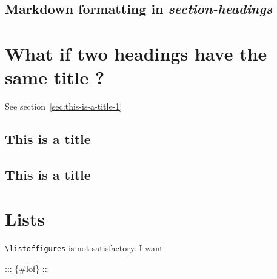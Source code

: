 \documentclass[
]{article}
\newenvironment{Shaded}{}{}
\newcommand{\NormalTok}[1]{#1}
\begin{document}
\subsection{\texorpdfstring{Markdown \textbf{formatting} in
\emph{section-headings}}{Markdown formatting in section-headings}}\label{markdown-formatting-in-section-headings}

\section{What if two headings have the same title
?}\label{what-if-two-headings-have-the-same-title}

See section~\ref{sec:this-is-a-title-1}

\subsection{This is a title}\label{this-is-a-title}

\subsection{This is a title}\label{this-is-a-title-1}

\section{Lists}\label{lists-1}

\texttt{\textbackslash{}listoffigures} is not satisfactory. I want

\begin{Shaded}
\begin{Highlighting}[]
\NormalTok{::: \{\#lof\}}
\NormalTok{:::}
\end{Highlighting}
\end{Shaded}
\end{document}
